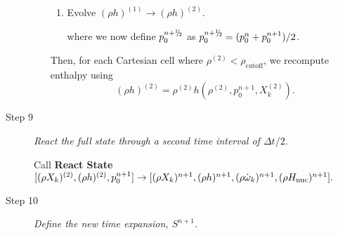 \documentclass{aastex62}
\newcommand{\sfrac}[2]{\mathchoice
  {\kern0em\raise.5ex\hbox{\the\scriptfont0 #1}\kern-.15em/
   \kern-.15em\lower.25ex\hbox{\the\scriptfont0 #2}}
  {\kern0em\raise.5ex\hbox{\the\scriptfont0 #1}\kern-.15em/
   \kern-.15em\lower.25ex\hbox{\the\scriptfont0 #2}}
  {\kern0em\raise.5ex\hbox{\the\scriptscriptfont0 #1}\kern-.2em/
   \kern-.15em\lower.25ex\hbox{\the\scriptscriptfont0 #2}}
  {#1\!/#2}}
\newcommand{\myhalf}{\sfrac{1}{2}}
\newcommand{\eb}{{\bf{e}}}
\newcommand{\Ub}{{\bf{U}}}
\newcommand{\dt}{\Delta t}
\newcommand{\Hnuc}{H_{\rm nuc}}
\newcommand{\omegadot}{\dot\omega}
\newcommand{\pred}{{\rm pred}}
\newcommand{\nph}{{n+\myhalf}}
\newcommand{\uadvtwo}{\Ub^{\mathrm{ADV}}}
\begin{document}
\begin{description}
\begin{enumerate}
\begin{enumerate}
\item Evolve $(\rho h)^{(1)} \rightarrow (\rho h)^{(2)}$.
where we now define $p_0^\nph$ as $p_0^\nph = (p_0^n+p_0^{n+1})/2$.

\end{enumerate}

Then, for each Cartesian cell where $\rho^{(2)} < \rho_\mathrm{cutoff}$, we recompute enthalpy using
\begin{equation}
(\rho h)^{(2)} = \rho^{(2)}h\left(\rho^{(2)},p_0^{n+1},X_k^{(2)}\right).
\end{equation}

\end{enumerate}

\item[Step 9] {\em React the full state through a second time interval of $\dt / 2.$}

Call {\bf React State}$[(\rho X_k)^{(2)},(\rho h)^{(2)}, p_0^{n+1}] \rightarrow [(\rho X_k)^{n+1}, (\rho h)^{n+1}, (\rho \omegadot_k)^{n+1}, (\rho \Hnuc)^{n+1}].$

\item[Step 10] {\em Define the new time expansion, $S^{n+1}$.}


\end{description}
\end{document}
